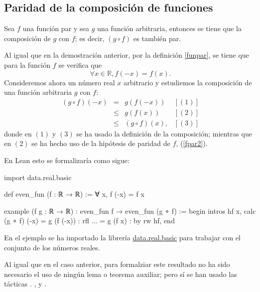 \subsection{Paridad de la composición de funciones}

\begin{teorema}
  Sea \(f\) una función par y sea \(g\) una función arbitraria, entonces
  se tiene que la composición de \(g\) con \(f\); es decir, \((g ∘ f)\)
  es también par.
\end{teorema}

\begin{demostracion}
  Al igual que en la demostración anterior, por la definición
  \ref{funpar}, se tiene que para la función \(f\) se verifica que
  \begin{equation}\label{fpar2}
     ∀ x ∈ ℝ, f(-x) = f(x).
  \end{equation}
  Consideremos ahora un número real \(x\) arbitrario y estudiemos la
  composición de una función arbitraria \(g\) con \(f\):
  \[\begin{array}{llll}
      (g ∘ f)(-x) &= &g(f(-x))    & [(1)]\\
                  &≤ &g(f(x))     & [(2)] \\
                  &≤ &(g ∘ f)(x), & [(3)]
    \end{array}\]
  donde en \((1)\) y \((3)\) se ha usado la definición de la
  composición; mientras que en \((2)\) se ha hecho uso de la hipótesis
  de paridad de \(f\), (\ref{fpar2}).
\end{demostracion}

En Lean esto se formalizaría como sigue:
\begin{leancode}
import data.real.basic

def even_fun (f : ℝ → ℝ) := ∀ x, f (-x) = f x

example (f g : ℝ → ℝ) : even_fun f → even_fun (g ∘ f) :=
begin
  intros hf x,
  calc (g ∘ f) (-x)
      = g (f (-x)) : rfl
  ... = g (f x)    : by rw hf,
end
\end{leancode}

En el ejemplo se ha importado la librería  \href{https://github.com/leanprover-community/mathlib/blob/master/src/data/real/basic.lean}{data.real.basic}
para trabajar con el conjunto de los números reales.

Al igual que en el caso anterior, para formalziar este resultado no ha sido
necesario el uso de ningún lema o teorema auxiliar; pero sí se han usado
las tácticas
.
,
 y
.


